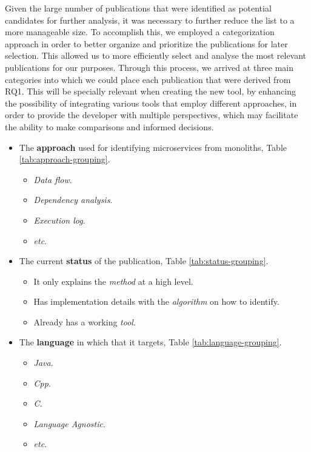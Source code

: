 \documentclass[conference]{IEEEtran}
\begin{document}
Given the large number of publications that were identified as potential
candidates for further analysis, it was necessary to further reduce the list to
a more manageable size. To accomplish this, we employed a categorization
approach in order to better organize and prioritize the publications for later
selection. This allowed us to more efficiently select and analyse the most
relevant publications for our purposes. Through this process, we arrived at
three main categories into which we could place each publication that were
derived from RQ1. This will be specially relevant when creating the new tool,
by enhancing the possibility of integrating various tools that employ different
approaches, in order to provide the developer with multiple perspectives, which
may facilitate the ability to make comparisons and informed decisions.

\begin{itemize}
  \item The \textbf{approach} used for identifying microservices from
    monoliths, Table \ref{tab:approach-grouping}.
  \begin{itemize}
    \item \textit{Data flow}.
    \item \textit{Dependency analysis}.
    \item \textit{Execution log}.
    \item \textit{etc}.
  \end{itemize}
  \item The current \textbf{status} of the publication, Table
    \ref{tab:status-grouping}.
  \begin{itemize}
    \item It only explains the \textit{method} at a high level.
    \item Has implementation details with the \textit{algorithm} on how to
      identify.
    \item Already has a working \textit{tool}.
  \end{itemize}
  \item The \textbf{language} in which that it targets, Table
    \ref{tab:language-grouping}.
  \begin{itemize}
    \item \textit{Java}.
    \item \textit{Cpp}.
    \item \textit{C}.
    \item \textit{Language Agnostic}.
    \item \textit{etc}.
  \end{itemize}
\end{itemize}
\end{document}

